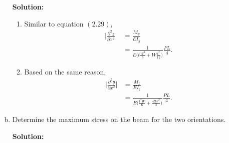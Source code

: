 \documentclass[12pt]{article}
\begin{document}
\begin{enumerate}[(a)]
	      \textbf{Solution:}
	      \begin{enumerate}[(b1)]
		      \item Similar to equation $(2.29)$,
		            \begin{equation}
			            \begin{split}
				            \bigg| \frac{ \partial^2 z }{ \partial  x^2} \bigg| &= \frac{ M_y }{ E I_y }\\
				            &= \frac{ 1 }{ E  \big( t \frac{ W^3 }{ 6 } + W \frac{ t^3 }{ 12 } \big)} \frac{ P L }{ 4 }.
			            \end{split}
		            \end{equation}
		      \item Based on the same reason,
		            \begin{equation}
			            \begin{split}
				            \bigg| \frac{ \partial^2 y }{ \partial x^2 } \bigg| &= \frac{ M_z }{ E I_z } \\
				            &= \frac{ 1 }{ E \big( \frac{t^3 W}{6} + \frac{4 t W^3}{3} \big)} \frac{ P L }{ 4 }.
			            \end{split}
		            \end{equation}
	      \end{enumerate}
	\item Determine the maximum stress on the beam for the two orientations.

	      \textbf{Solution:}


\end{enumerate}
\end{document}
